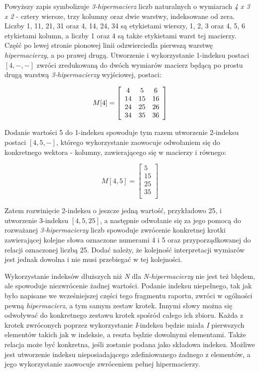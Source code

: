 \documentclass[11pt,a4paper]{llncs}
\begin{document}
Powyższy zapis symbolizuje \emph{3-hipermacierz} liczb naturalnych o wymiarach \emph{4 x 3 x 2} - cztery wiersze, trzy kolumny oraz dwie warstwy, indeksowane od zera. 
Liczby 1, 11, 21, 31 oraz 4, 14, 24, 34 są etykietami wierszy, 1, 2, 3 oraz 4, 5, 6 etykietami kolumn, a liczby 1 oraz 4 są także etykietami warst tej macierzy.
Część po lewej stronie pionowej linii odzwierciedla pierwszą warstwę \emph{hipermacierzy}, a po prawej drugą.
Utworzenie i wykorzystanie 1-indeksu postaci \( [4, -, -] \) zwróci zredukowaną do dwóch wymiarów macierz będącą po prostu drugą warstwą \emph{3-hipermacierzy} wyjściowej, postaci:

\[
M[4] = 
\left[
\begin{array}{c c c}
4 	& 5 	& 6 	\\
14 	& 15 	& 16 	\\
24 	& 25 	& 26 	\\
34 	& 35	& 36 	\\
\end{array}
\right]
\]

Dodanie wartości 5 do 1-indeksu spowoduje tym razem utworzenie 2-indeksu postaci \( [4, 5, -] \), którego wykorzystanie zaowocuje odwołaniem się do konkretnego wektora - kolumny, zawierającego się w macierzy i równego:

\[
M[4, 5] = 
\left[
\begin{array}{c}
5 \\
15 \\
25 \\
35 \\
\end{array}
\right]
\]

Zatem rozwinięcie 2-indeksu o jeszcze jedną wartość, przykładowo 25, i utworzenie 3-indeksu $[4, 5, 25]$, a następnie odwołanie się za jego pomocą do rozważanej \emph{3-hipermacierzy} liczb spowoduje zwrócenie konkretnej krotki zawierającej kolejne słowa oznaczone numerami 4 i 5 oraz przyporządkowanej do relacji oznaczonej liczbą 25.
Dodać należy, że kolejność interpretacji wymiarów jest jednak dowolna i nie musi przebiegać w tej kolejności.


Wykorzystanie indeksów dłuższych niż \emph{N} dla \emph{N-hipermacierzy} nie jest też błędem, ale spowoduje niezwrócenie żadnej wartości.
Podanie indeksu niepełnego, tak jak było napisane we wcześniejszej części tego fragmentu raportu, zwróci w ogólności pewną \emph{hipermacierz}, a tym samym zestaw krotek.
Innymi słowy można się odwoływać do konkretnego zestawu krotek spośród całego ich zbioru. 
Każda z krotek zwróconych poprzez wykorzystanie \emph{I}-indeksu będzie miała \emph{I} pierwszych elementów takich jak w indeksie, a reszta będzie dowolnymi elementami.
Także relacja może być konkretna, jeśli zostanie podana jako składowa indeksu.
Możliwe jest utworzenie indeksu nieposiadającego zdefiniowanego żadnego z elementów, a jego wykorzystanie zaowocuje zwróceniem pełnej hipermacierzy.
\end{document}
